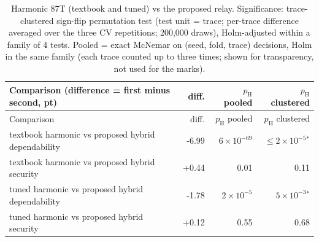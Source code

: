\begin{longtable}{@{}p{8.6cm}rrr@{}}
\caption{Harmonic 87T (textbook and tuned) vs the proposed relay. Significance: trace-clustered sign-flip permutation test (test unit = trace; per-trace difference averaged over the three CV repetitions; 200{,}000 draws), Holm-adjusted within a family of 4 tests. Pooled = exact McNemar on (seed, fold, trace) decisions, Holm in the same family (each trace counted up to three times; shown for transparency, not used for the marks).}\label{tab:S6}\\
\toprule Comparison (difference = first minus second, pt) & diff. & $p_{\mathrm{H}}$ pooled & $p_{\mathrm{H}}$ clustered \\ \midrule \endfirsthead
\toprule Comparison & diff. & $p_{\mathrm{H}}$ pooled & $p_{\mathrm{H}}$ clustered \\ \midrule \endhead
textbook harmonic vs proposed hybrid dependability & -6.99 & $6\times10^{-69}$ & $\le 2\times10^{-5}$$^{*}$ \\
textbook harmonic vs proposed hybrid security & +0.44 & 0.01 & 0.11 \\
tuned harmonic vs proposed hybrid dependability & -1.78 & $2\times10^{-5}$ & $5\times10^{-3}$$^{*}$ \\
tuned harmonic vs proposed hybrid security & +0.12 & 0.55 & 0.68 \\
\bottomrule
\end{longtable}